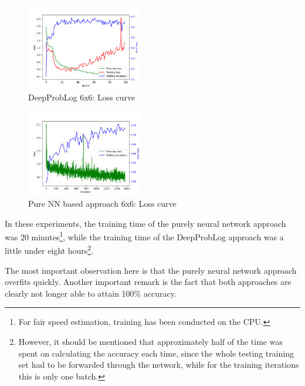 \documentclass[english]{sobraep}
\begin{document}
\begin{figure}[htp]
    \begin{center}
    \includegraphics[width=0.45\textwidth]{loss_curve_deepproblog_6x6.png} 
    \captionsetup{justification=centering}
    \caption{DeepProbLog 6x6: Loss curve}
    \label{fig:loss_curve_deepproblog_6x6}
    \end{center}
\end{figure}

\begin{figure}[htp]
    \begin{center}
    \includegraphics[width=0.45\textwidth]{loss_curve_pure_NN_6x6.png} 
    \captionsetup{justification=centering}
    \caption{Pure NN based approach 6x6: Loss curve}
    \label{fig:loss_curve_pure_NN_6x6}
    \end{center}
\end{figure}

In these experiments, the training time of the purely neural network approach was 20 minutes\footnote{For fair speed estimation, training has been conducted on the CPU.}, while the training time of the DeepProbLog approach was a little under eight hours\footnote{However, it should be mentioned that approximately half of the time was spent on calculating the accuracy each time, since the whole testing training set had to be forwarded through the network, while for the training iterations this is only one batch.}.

The most important observation here is that the purely neural network approach overfits quickly. Another important remark is the fact that both approaches are clearly not longer able to attain 100\% accuracy.
\end{document}

